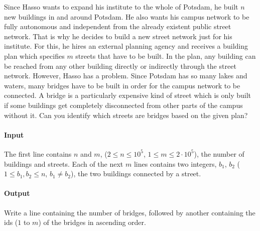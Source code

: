 



\makeheader

Since Hasso wants to expand his institute to the whole of Potsdam, he built $n$ new buildings in and around Potsdam.
He also wants his campus network to be fully autonomous and independent from the already existent public street network.
That is why he decides to build a new street network just for his institute.
For this, he hires an external planning agency and receives a building plan which specifies $m$ streets that have to be built.
In the plan, any building can be reached from any other building directly or indirectly through the street network.
However, Hasso has a problem.
Since Potsdam has so many lakes and waters, many bridges have to be built in order for the campus network to be connected.
A bridge is a particularly expensive kind of street which is only built if some buildings get completely disconnected from other parts of the campus without it.
Can you identify which streets are bridges based on the given plan? 

\paragraph*{Input}

The first line contains $n$ and $m$, ($2 \leq n \leq 10^5$, $1 \leq m \leq 2 \cdot 10^5$), the number of buildings and streets.
Each of the next $m$ lines contains two integers, $b_1$, $b_2$ ($1 \leq b_1,b_2\leq n$, $b_1 \neq b_2$), the two buildings connected by a street.

\paragraph*{Output}

Write a line containing the number of bridges, followed by another
containing the ids ($1$ to $m$) of the bridges in ascending order.

\begin{samples}
\end{samples}

